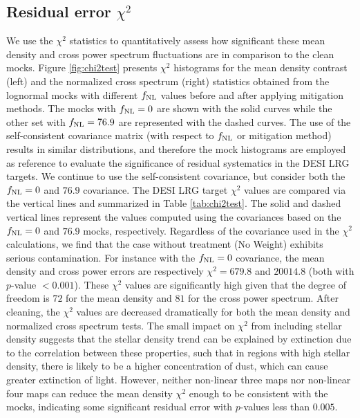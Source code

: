 \subsection{Residual error $\chi^{2}$}
We use the $\chi^{2}$ statistics to quantitatively assess how significant these mean density and cross power spectrum fluctuations are in comparison to the clean mocks. Figure \ref{fig:chi2test} presents $\chi^{2}$ histograms for the mean density contrast (left) and the normalized cross spectrum (right) statistics obtained from the lognormal mocks with different $f_{\rm NL}$ values before and after applying mitigation methods. The mocks with $f_{\rm NL}=0$ are shown with the solid curves while the other set with $f_{\rm NL}=76.9$ are represented with the dashed curves. The use of the self-consistent covariance matrix (with respect to $f_{\rm NL}$ or mitigation method) results in similar distributions, and therefore the mock histograms are employed as reference to evaluate the significance of residual systematics in the DESI LRG targets. We continue to use the self-consistent covariance, but consider both the $f_{\rm NL}=0$ and $76.9$ covariance. The DESI LRG target $\chi^{2}$ values are compared via the vertical lines and summarized in Table \ref{tab:chi2test}. The solid and dashed vertical lines represent the values computed using the covariances based on the $f_{\rm NL}=0$ and $76.9$ mocks, respectively. Regardless of the covariance used in the $\chi^{2}$ calculations, we find that the case without treatment (No Weight) exhibits serious contamination. For instance with the $f_{\rm NL}=0$ covariance, the mean density and cross power errors are respectively $\chi^{2}=679.8$ and $20014.8$ (both with $p$-value $< 0.001$). These $\chi^{2}$ values are significantly high given that the degree of freedom is $72$ for the mean density and $81$ for the cross power spectrum. After cleaning, the $\chi^{2}$ values are decreased dramatically for both the mean density and normalized cross spectrum tests. The small impact on $\chi^{2}$ from including stellar density suggests that the stellar density trend can be explained by extinction due to the correlation between these properties, such that in regions with high stellar density, there is likely to be a higher concentration of dust, which can cause greater extinction of light. However, neither non-linear three maps nor non-linear four maps can reduce the mean density $\chi^{2}$ enough to be consistent with the mocks, indicating some significant residual error with $p$-values less than $0.005$.

